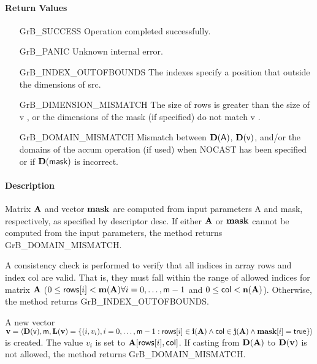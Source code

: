 \paragraph{Return Values}

\begin{itemize}[leftmargin=2.1in]
\item[{\sf GrB\_SUCCESS}]             Operation completed successfully.
\item[{\sf GrB\_PANIC}]               Unknown internal error.
\item[{\sf GrB\_INDEX\_OUTOFBOUNDS}]  The indexes specify a position that outside the dimensions of src.
\item[{\sf GrB\_DIMENSION\_MISMATCH}] 
       The size of {\sf rows} is greater than the size of {\sf v} , 
       or the dimensions of the mask (if specified) do not match {\sf v }.
\item[{\sf GrB\_DOMAIN\_MISMATCH}]    Mismatch between $\bold{D}(\sf A)$, 
                                      $\bold{D}({\sf v})$, and/or the domains of the 
                                      {\sf accum} operation (if used) when {\sf NOCAST} has
                                      been specified or if $\bold{D}(\sf mask)$ is incorrect.
\end{itemize}

\paragraph{Description}

Matrix ${\bf A}$ and vector ${\bf mask}$ are computed from input
parameters {\sf A} and {\sf mask}, respectively, as specified by
descriptor {\sf desc}.  If either ${\bf A}$ or ${\bf mask}$
cannot be computed from the input parameters, the method returns {\sf
GrB\_DOMAIN\_MISMATCH}.

A consistency check is performed to verify that all indices in array
{\sf rows} and index {\sf col} are valid. That is, they must fall within the range of allowed
indices for matrix ${\bf A}$ ($0 \leq {\sf rows}[i] < \bold{m}({\bf A})
\forall i = 0,\ldots,{\sf m}-1$ and
$0 \leq {\sf col} < \bold{n}({\bf A})$).  Otherwise, the method returns {\sf
GrB\_INDEX\_OUTOFBOUNDS}.

A new vector ${\bf v} = \langle \bold{D}({\sf v}),{\sf m},
\bold{L}({\bf v}) = \{ (i,v_{i}), i = 0,\ldots,{\sf m}-1 : {\sf rows}[i]
\in \bold{i}({\bf A}) \wedge {\sf col} \in \bold{j}({\bf A}) \wedge {\bf mask}[i] = {\sf true} \} \rangle$
is created.  The value $v_{i}$ is set to ${\bf A}[{\sf rows}[i],{\sf col}]$. If
casting from $\bold{D}({\bf A})$ to $\bold{D}({\bf v})$ is not
allowed, the method returns {\sf GrB\_DOMAIN\_MISMATCH}.

